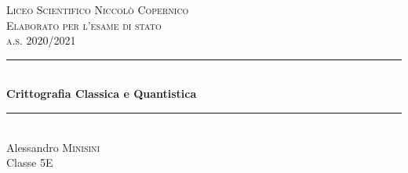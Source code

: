 \documentclass[italian,A4,12pt]{article}
\begin{document}
\begin{titlepage}

\newcommand{\HRule}{\rule{\linewidth}{0.5mm}} %

\center %


\textsc{\LARGE Liceo Scientifico Niccolò Copernico}\\[1.5cm] %
\textsc{\Large Elaborato per l'esame di stato}\\[0.5cm] %
\textsc{\large a.s. 2020/2021}\\[0.5cm] %


\HRule \\[0.4cm]
{ \huge \bfseries Crittografia Classica e Quantistica}\\[0.4cm] %
\HRule \\[1.5cm]




Alessandro \textsc{Minisini}\\[1cm] %
{\large Classe 5E}\\[2cm]




\end{titlepage}
\end{document}

